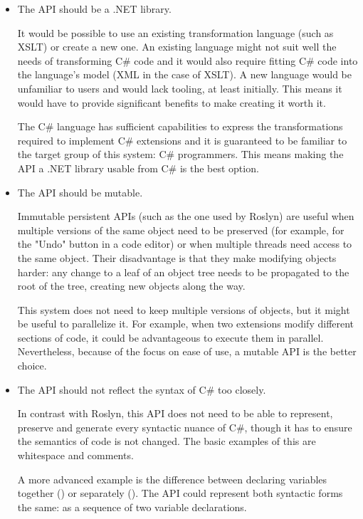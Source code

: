 \begin{itemize}
\item The \ac{API} should be a .NET library.

It would be possible to use an existing transformation language (such as \ac{XSLT}) or create a new one.
An existing language might not suit well the needs of transforming C\# code and it would also require fitting C\# code into the language's model (\ac{XML} in the case of \ac{XSLT}).
A new language would be unfamiliar to users and would lack tooling, at least initially. This means it would have to provide significant benefits to make creating it worth it.

The C\# language has sufficient capabilities to express the transformations required to implement C\# extensions and it is guaranteed to be familiar to the target group of this system: C\# programmers. This means making the \ac{API} a .NET library usable from C\# is the best option.
	
\item The \ac{API} should be mutable.

Immutable persistent \acp{API} (such as the one used by Roslyn) are useful when multiple versions of the same object need to be preserved (for example, for the "Undo" button in a code editor) or when multiple threads need access to the same object. Their disadvantage is that they make modifying objects harder: any change to a leaf of an object tree needs to be propagated to the root of the tree, creating new objects along the way.

This system does not need to keep multiple versions of objects, but it might be useful to parallelize it. For example, when two extensions modify different sections of code, it could be advantageous to execute them in parallel. Nevertheless, because of the focus on ease of use, a mutable \ac{API} is the better choice.

\item The \ac{API} should not reflect the syntax of C\# too closely.

In contrast with Roslyn, this \ac{API} does not need to be able to represent, preserve and generate every syntactic nuance of C\#, though it has to ensure the semantics of code is not changed. The basic examples of this are whitespace and comments.

A more advanced example is the difference between declaring variables together () or separately (). The \ac{API} could represent both syntactic forms the same: as a sequence of two variable declarations. 


\end{itemize}
